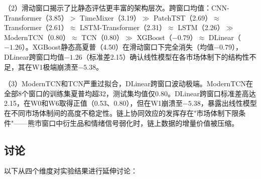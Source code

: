 \documentclass[12pt,a4paper]{ctexart}
\begin{document}
（2）滑动窗口揭示了比静态评估更丰富的架构层次。跨窗口均值：CNN-Transformer（3.85）$>$ TimeMixer（3.19）$\gg$ PatchTST（2.69）$\approx$ Transformer（2.61）$\approx$ LSTM-Transformer（2.31）$\approx$ LSTM（2.26）$\gg$ ModernTCN（0.80）$\approx$ TCN（0.80）$\gg$ XGBoost（$-0.79$）$\approx$ DLinear（$-1.26$）。XGBoost静态高夏普（4.50）在滑动窗口下完全消失（均值$-0.79$），DLinear跨窗口均值$-1.26$（标准差2.15）确认线性模型在各市场体制下的结构性不足，其在W1极端崩溃至$-5.38$。

（3）ModernTCN和TCN严重过拟合，DLinear跨窗口波动极端。ModernTCN在全部8个窗口的训练集夏普均超32，测试集均值仅0.80。DLinear跨窗口标准差高达2.15，在W0和W6取得正值（0.53、0.80），但在W1崩溃至$-5.38$，暴露出线性模型在不同市场体制间的高度不稳定性。链上协同效应的发挥存在"市场体制下限条件"——熊市窗口中衍生品和情绪信号弱化时，链上数据的增量价值被压缩。


\subsection{讨论}

以下从四个维度对实验结果进行延伸讨论：
\end{document}
